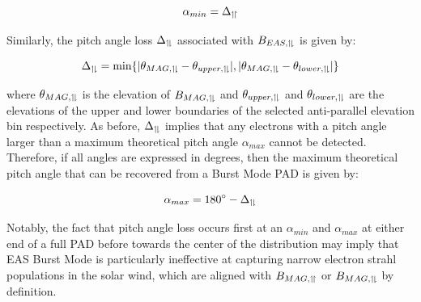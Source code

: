 \begin{equation} \label{eq: alpha min}
    \alpha_{min}=\Delta_{\upharpoonleft \! \upharpoonright}
\end{equation}

Similarly, the pitch angle loss \(\Delta_{\upharpoonleft \! \downharpoonright}\) associated with \(B_{EAS, \upharpoonleft \! \downharpoonright}\) is given by:

\begin{equation} \label{eq: antiparallel loss}
    \Delta_{\upharpoonleft \! \downharpoonright}=\min\{|\theta_{MAG, \upharpoonleft \! \downharpoonright}-\theta_{upper, \upharpoonleft \! \downharpoonright}|, |\theta_{MAG, \upharpoonleft \! \downharpoonright}-\theta_{lower, \upharpoonleft \! \downharpoonright}|\}
\end{equation}

where \(\theta_{MAG, \upharpoonleft \! \downharpoonright}\) is the elevation of \(B_{MAG, \upharpoonleft \! \downharpoonright}\) and \(\theta_{upper, \upharpoonleft \! \downharpoonright}\) and \(\theta_{lower, \upharpoonleft \! \downharpoonright}\) are the elevations of the upper and lower boundaries of the selected anti-parallel elevation bin respectively. As before, \(\Delta_{\upharpoonleft \! \downharpoonright}\) implies that any electrons with a pitch angle larger than a maximum theoretical pitch angle \(\alpha_{max}\) cannot be detected. Therefore, if all angles are expressed in degrees, then the maximum theoretical pitch angle that can be recovered from a Burst Mode PAD is given by:

\begin{equation} \label{eq: alpha max}
    \alpha_{max}=180\degree-\Delta_{\upharpoonleft \! \downharpoonright}
\end{equation}

Notably, the fact that pitch angle loss occurs first at an \(\alpha_{min}\) and \(\alpha_{max}\) at either end of a full PAD before  towards the center of the distribution may imply that EAS Burst Mode is particularly ineffective at capturing narrow electron strahl populations in the solar wind, which are aligned with \(B_{MAG, \upharpoonleft \! \upharpoonright}\) or \(B_{MAG, \upharpoonleft \! \downharpoonright}\) by definition\cite{kajdic2016}.
\\

